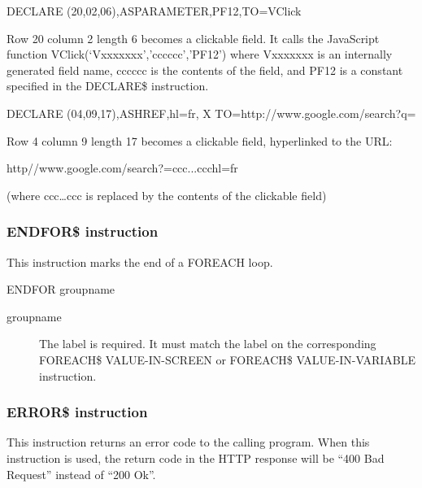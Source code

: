 \documentclass[letterpaper,10pt,english]{sphinxmanual}
\begin{document}
\begin{sphinxVerbatim}[commandchars=\\\{\}]
DECLARE\PYGZdl{} (20,02,06),AS\PYGZhy{}PARAMETER,\PYGZsq{}PF12\PYGZsq{},TO=VClick
\end{sphinxVerbatim}

Row 20 column 2 length 6 becomes a clickable field. It calls the JavaScript function VClick(‘Vxxxxxxx’,’cccccc’,’PF12’) where Vxxxxxxx is an internally generated field name, cccccc is the contents of the field, and PF12 is a constant specified in the DECLARE\$ instruction.

\begin{sphinxVerbatim}[commandchars=\\\{\}]
DECLARE\PYGZdl{} (04,09,17),AS\PYGZhy{}HREF,\PYGZsq{}\PYGZam{}\PYGZam{}hl=fr\PYGZsq{},                              X
    TO=\PYGZsq{}http://www.google.com/search?q=\PYGZsq{}
\end{sphinxVerbatim}

Row 4 column 9 length 17 becomes a clickable field, hyperlinked to the URL:

\begin{sphinxVerbatim}[commandchars=\\\{\}]
http//www.google.com/search?=ccc...ccc\PYGZam{}hl=fr
\end{sphinxVerbatim}

(where ccc…ccc is replaced by the contents of the clickable field)


\subsubsection{ENDFOR\$ instruction}
\label{\detokenize{User_Guide:endfor-instruction}}
This instruction marks the end of a FOREACH loop.

\begin{sphinxVerbatim}[commandchars=\\\{\}]
ENDFOR\PYGZdl{} groupname
\end{sphinxVerbatim}
\begin{description}
\item[{groupname}] \leavevmode
The label is required. It must match the label on the corresponding FOREACH\$ VALUE-IN-SCREEN or FOREACH\$ VALUE-IN-VARIABLE instruction.

\end{description}


\subsubsection{ERROR\$ instruction}
\label{\detokenize{User_Guide:error-instruction}}
This instruction returns an error code to the calling program. When this instruction is used, the return code in the
HTTP response will be “400 Bad Request” instead of “200 Ok”.
\end{document}

